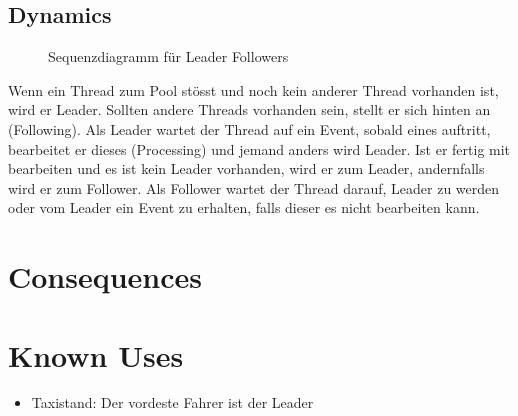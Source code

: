 \subsection{Dynamics}
\begin{figure}[H]
  \centering
  
  \caption{Sequenzdiagramm f\"ur Leader Followers}
\end{figure}
Wenn ein Thread zum Pool stösst und noch kein anderer Thread vorhanden ist, wird er Leader. Sollten andere Threads vorhanden sein, stellt er sich hinten an (Following). Als Leader wartet der Thread auf ein Event, sobald eines auftritt, bearbeitet er dieses (Processing) und jemand anders wird Leader. Ist er fertig mit bearbeiten und es ist kein Leader vorhanden, wird er zum Leader, andernfalls wird er zum Follower. Als Follower wartet der Thread darauf, Leader zu werden oder vom Leader ein Event zu erhalten, falls dieser es nicht bearbeiten kann.

\section{Consequences}
\begin{itemize}
\end{itemize}

\section{Known Uses}
\begin{itemize}
    \item Taxistand: Der vordeste Fahrer ist der Leader
  \end{itemize}

